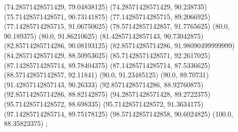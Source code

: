 {{{		(74.28571428571429, 79.04838125)
		(74.28571428571429, 90.238735)
		(75.71428571428571, 90.73141875)
		(77.14285714285715, 89.2066925)
		(77.14285714285715, 91.06750625)
		(78.57142857142857, 91.7765625)
		(80.0, 90.189375)
		(80.0, 91.86210625)
		(81.42857142857143, 90.73042875)
		(82.85714285714286, 90.08193125)
		(82.85714285714286, 91.98090499999999)
		(84.28571428571429, 88.50953625)
		(85.71428571428571, 92.2617025)
		(87.14285714285714, 89.78404375)
		(87.14285714285714, 87.5336625)
		(88.57142857142857, 92.11841)
		(90.0, 91.23485125)
		(90.0, 89.70731)
		(91.42857142857143, 90.26333)
		(92.85714285714286, 88.92760875)
		(92.85714285714286, 88.82142875)
		(94.28571428571428, 89.2722375)
		(95.71428571428572, 88.698335)
		(95.71428571428572, 91.3634175)
		(97.14285714285714, 89.75178125)
		(98.57142857142858, 90.6024825)
		(100.0, 88.35823375)
	};

}}
